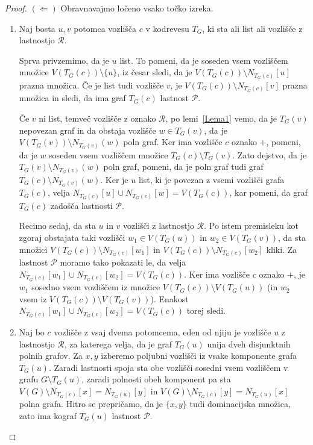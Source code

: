 \documentclass[12pt,a4paper,twoside]{article}
\theoremstyle{definition} %
\theoremstyle{plain} %
\numberwithin{equation}{section}  %
\begin{document}
\begin{proof}
\medskip
\noindent$(\Leftarrow)$ Obravnavajmo ločeno vsako točko izreka.
\begin{enumerate}[label=($\roman*$)]
\item Naj bosta $u,v$ potomca vozlišča $c$ v kodrevesu $T_G$, ki sta ali list ali vozlišče z lastnostjo $\mathcal{R}$.

Sprva privzemimo, da je $u$ list. To pomeni, da je soseden vsem vozliščem množice $V(T_G(c)) \setminus \{u\}$, iz česar sledi, da je $V(T_G(c)) \setminus N_{T_G(c)}[u]$ prazna množica. Če je list tudi vozlišče $v$, je $V(T_G(c)) \setminus N_{T_G(c)}[v]$ prazna množica in sledi, da ima graf $T_G(c)$ lastnost $\mathcal{P}$.

Če $v$ ni list, temveč vozlišče z oznako $\mathcal{R}$, po lemi~\ref{Lema1} vemo, da je $T_G(v)$ nepovezan graf in da obstaja vozlišče $w \in T_G(v)$, da je $V(T_G(v)) \setminus N_{T_G(v)}(w)$ poln graf. Ker ima vozlišče $c$ oznako $+$, pomeni, da je $w$ soseden vsem vozliščem množice $T_G(c) \setminus T_G(v)$. Zato dejstvo, da je $T_G(v) \setminus N_{T_G(v)}(w)$ poln graf, pomeni, da je poln graf tudi graf $T_G(c) \setminus N_{T_G(v)}(w)$. Ker je $u$ list, ki je povezan z vsemi vozlišči grafa $T_G(c)$, velja $N_{T_G(c)}[u] \cup N_{T_G(c)}[w] = V(T_G(c))$, kar pomeni, da graf $T_G(c)$ zadošča lastnosti $\mathcal{P}$.

Recimo sedaj, da sta $u$ in $v$ vozlišči z lastnostjo $\mathcal{R}$. Po istem premisleku kot zgoraj obstajata taki vozlišči $w_1 \in V(T_G(u))$ in $w_2 \in V(T_G(v))$, da sta množici $V(T_G(c)) \setminus N_{T_G(c)}[w_1]$ in $V(T_G(c)) \setminus N_{T_G(c)}[w_2]$ kliki. Za lastnost $\mathcal{P}$ moramo tako pokazati le, da velja $N_{T_G(c)}[w_1] \cup N_{T_G(c)}[w_2] = V(T_G(c))$. Ker ima vozlišče $c$ oznako $+$, je $w_1$ sosedno vsem vozliščem  iz množice $V(T_G(c)) \setminus V(T_G(u))$ (in $w_2$ vsem iz $V(T_G(c)) \setminus V(T_G(v))$). Enakost $N_{T_G(c)}[w_1] \cup N_{T_G(c)}[w_2] = V(T_G(c))$ torej sledi.

\item Naj bo $c$ vozlišče z vsaj dvema potomcema, eden od njiju je vozlišče $u$ z lastnostjo $\mathcal{R}$, za katerega velja, da je graf $T_G(u)$ unija dveh disjunktnih polnih grafov. Za $x,y$ izberemo poljubni vozlišči iz vsake komponente grafa $T_G(u)$. Zaradi lastnosti spoja sta obe vozlišči sosedni vsem vozliščem v grafu $G \setminus T_G(u)$, zaradi polnosti obeh komponent pa sta  $V(G) \setminus N_{T_G(c)}[x] = N_{T_G(u)}[y]$ in $V(G) \setminus N_{T_G(c)}[y] = N_{T_G(u)}[x]$ polna grafa. Hitro se prepričamo, da je $\{x, y\}$ tudi dominacijska množica, zato ima kograf $T_G(u)$ lastnost $\mathcal{P}$.\qedhere
\end{enumerate}
\end{proof}
\end{document}
